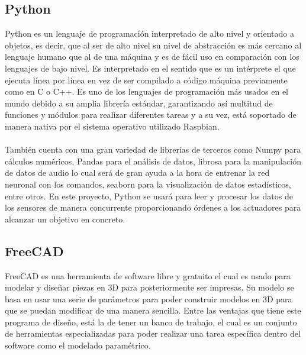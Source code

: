 \subsection{Python}
\label{subsec:python}

Python es un lenguaje de programación interpretado de alto nivel y orientado a objetos, es decir, que al ser de alto nivel su nivel de abstracción es más cercano al lenguaje humano que al de una máquina y es de fácil uso en comparación con los lenguajes de bajo nivel. Es interpretado en el sentido que es un intérprete el que ejecuta línea por línea en vez de ser compilado a código máquina previamente como en C o C++. Es uno de los lenguajes de programación más usados en el mundo debido a su amplia librería estándar, garantizando así multitud de funciones y módulos para realizar diferentes tareas y a su vez, está soportado de manera nativa por el sistema operativo utilizado Raspbian.\\ \\ También cuenta con una gran variedad de librerías de terceros como Numpy para cálculos numéricos, Pandas para el análisis de datos, librosa para la manipulación de datos de audio lo cual será de gran ayuda a la hora de entrenar la red neuronal con los comandos, seaborn para la visualización de datos estadísticos, entre otros. En este proyecto, Python se usará para leer y procesar los datos de los sensores de manera concurrente proporcionando órdenes a los actuadores para alcanzar un objetivo en concreto.



\subsection{FreeCAD}
\label{subsec:freecad}


FreeCAD es una herramienta de software libre y gratuito el cual es usado para modelar y diseñar piezas en 3D para posteriormente ser impresas. Su modelo se basa en usar una serie de parámetros para poder construir modelos en 3D para que se puedan modificar de una manera sencilla. Entre las ventajas que tiene este programa de diseño, está la de tener un banco de trabajo, el cual es un conjunto de herramientas especializadas para poder realizar una tarea específica dentro del software como el modelado paramétrico. 


